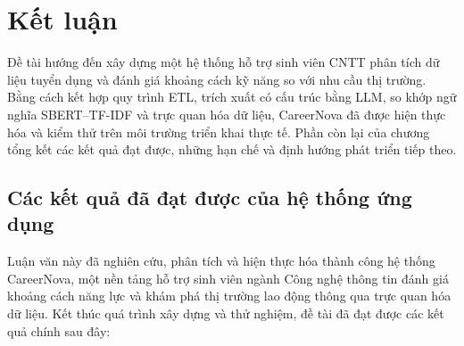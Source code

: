 \chapter{Kết luận}
\label{Chapter6}

Đề tài hướng đến xây dựng một hệ thống hỗ trợ sinh viên CNTT phân tích dữ liệu tuyển dụng và đánh giá khoảng cách kỹ năng so với nhu cầu thị trường. Bằng cách kết hợp quy trình ETL, trích xuất có cấu trúc bằng LLM, so khớp ngữ nghĩa SBERT--TF-IDF và trực quan hóa dữ liệu, CareerNova đã được hiện thực hóa và kiểm thử trên môi trường triển khai thực tế. Phần còn lại của chương tổng kết các kết quả đạt được, những hạn chế và định hướng phát triển tiếp theo.

\section{Các kết quả đã đạt được của hệ thống ứng dụng}

Luận văn này đã nghiên cứu, phân tích và hiện thực hóa thành công hệ thống CareerNova, một nền tảng hỗ trợ sinh viên ngành Công nghệ thông tin đánh giá khoảng cách năng lực và khám phá thị trường lao động thông qua trực quan hóa dữ liệu. Kết thúc quá trình xây dựng và thử nghiệm, đề tài đã đạt được các kết quả chính sau đây:

